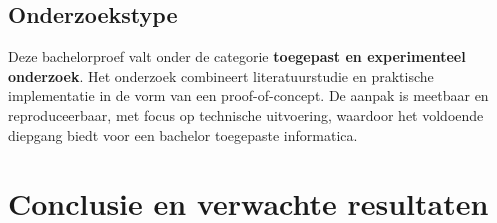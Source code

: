 \subsection{Onderzoekstype}
Deze bachelorproef valt onder de categorie \textbf{toegepast en experimenteel onderzoek}.  
Het onderzoek combineert literatuurstudie en praktische implementatie in de vorm van een proof-of-concept.  
De aanpak is meetbaar en reproduceerbaar, met focus op technische uitvoering, waardoor het voldoende diepgang biedt voor een bachelor toegepaste informatica.
\newline
\newline
\newline
\newline
\newline
\newline

\section{Conclusie en verwachte \newline resultaten}
\label{sec:conclusie}

